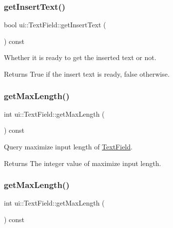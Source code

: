 \subsubsection{\texorpdfstring{get\+Insert\+Text()}{getInsertText()}\hspace{0.1cm}{\footnotesize\ttfamily [2/2]}}
{\footnotesize\ttfamily bool ui\+::\+Text\+Field\+::get\+Insert\+Text (\begin{DoxyParamCaption}{ }\end{DoxyParamCaption}) const}



Whether it is ready to get the inserted text or not. 

\begin{DoxyReturn}{Returns}
True if the insert text is ready, false otherwise. 
\end{DoxyReturn}
\mbox{\label{classui_1_1TextField_a21ae7052464727df77737475ebe4cf34}} 
\subsubsection{\texorpdfstring{get\+Max\+Length()}{getMaxLength()}\hspace{0.1cm}{\footnotesize\ttfamily [1/2]}}
{\footnotesize\ttfamily int ui\+::\+Text\+Field\+::get\+Max\+Length (\begin{DoxyParamCaption}{ }\end{DoxyParamCaption}) const}



Query maximize input length of \hyperlink{classui_1_1TextField}{Text\+Field}. 

\begin{DoxyReturn}{Returns}
The integer value of maximize input length. 
\end{DoxyReturn}
\mbox{\label{classui_1_1TextField_a21ae7052464727df77737475ebe4cf34}} 
\subsubsection{\texorpdfstring{get\+Max\+Length()}{getMaxLength()}\hspace{0.1cm}{\footnotesize\ttfamily [2/2]}}
{\footnotesize\ttfamily int ui\+::\+Text\+Field\+::get\+Max\+Length (\begin{DoxyParamCaption}{ }\end{DoxyParamCaption}) const}



